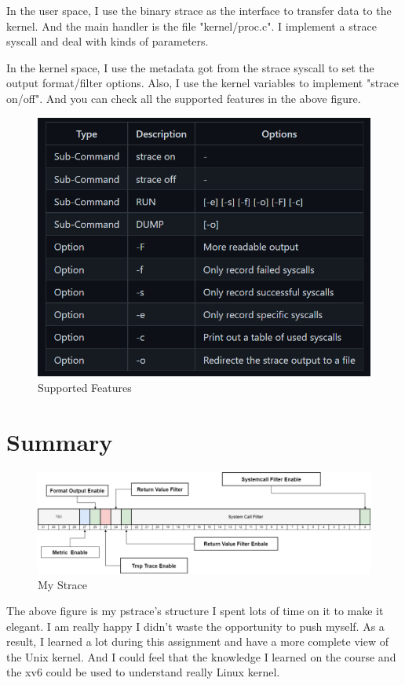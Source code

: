 \documentclass[11pt,oneside,a4paper]{article}
\begin{document}
In the user space, I use the binary strace as the interface to
transfer data to the kernel. And the main handler is the file "kernel/proc.c". I
implement a strace syscall and deal with kinds of parameters. 

In the kernel space, I use the metadata got from the strace syscall to set the
output format/filter options. Also, I use the kernel variables to implement
"strace on/off". And you can check all the supported features in the above figure.


\begin{figure}[H]
    \includegraphics[width=4.75in]{1-39.png}
    \centering
    \caption{Supported Features}
\end{figure}


\section{Summary}

\begin{figure}[H]
    \includegraphics[width=4.75in]{pstrace.png}
    \centering
    \caption{My Strace}
\end{figure}

The above figure is my pstrace's structure I spent lots of time on it to make it elegant.
I am really happy I didn't waste the opportunity
to push myself. As a result, I learned a lot during this assignment and have a more 
complete view of the Unix kernel. And I could feel that the knowledge I learned on 
the course and the xv6 could be used to understand really Linux kernel. 
\end{document}
